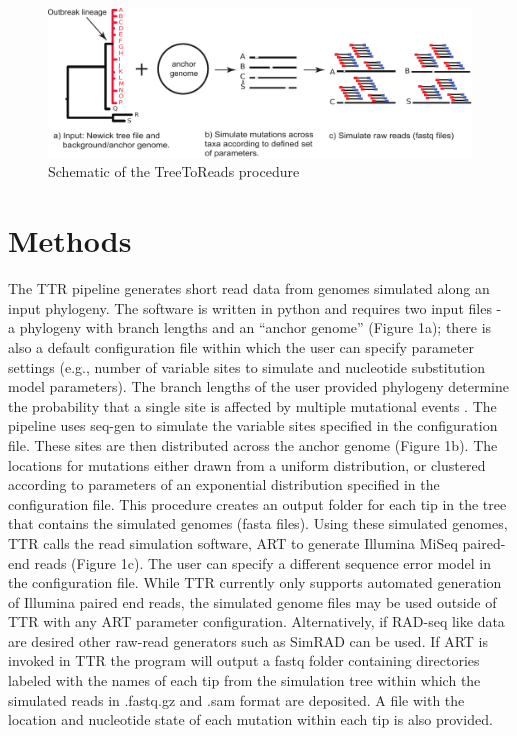 \begin{figure}[trees]
\includegraphics[width=6in]{TTR-figure}
\caption{Schematic of the TreeToReads procedure}
\label{scheme}
\end{figure}

\section{Methods}
The TTR pipeline generates short read data from genomes simulated along an input phylogeny. 
The software is written in python and requires two input files - a phylogeny with branch lengths and an “anchor genome” (Figure 1a); 
there is also a default configuration file within which the user can specify parameter settings (e.g., number of variable sites to simulate and nucleotide substitution model parameters). 
The branch lengths of the user provided phylogeny determine the probability that a single site is affected by multiple mutational events \citep{sukumaran_dendropy:_2010}.
The pipeline uses seq-gen \citep{rambaut_seq-gen:_1997} to simulate the variable sites specified in the configuration file. 
These sites are then distributed across the anchor genome (Figure 1b).
The locations for mutations either drawn from a uniform distribution, 
or clustered according to parameters of an exponential distribution specified in the configuration file. 
This procedure creates an output folder for each tip in the tree that contains the simulated genomes (fasta files). Using these simulated genomes, 
TTR calls the read simulation software, ART \citep{huang_art:_2012} to generate Illumina MiSeq paired-end reads (Figure 1c). 
The user can specify a different sequence error model in the configuration file. 
While TTR currently only supports automated generation of Illumina paired end reads, the simulated genome files may be used outside of TTR with any ART parameter configuration. 
Alternatively, if RAD-seq like data are desired other raw-read generators such as SimRAD \citep{lepais_simrad:_2014} can be used. 
If ART is invoked in TTR the program will output a fastq folder containing directories labeled with the names of each tip from the 
simulation tree within which the simulated reads in .fastq.gz and .sam format are deposited. 
A file with the location and nucleotide state of each mutation within each tip is also provided.


